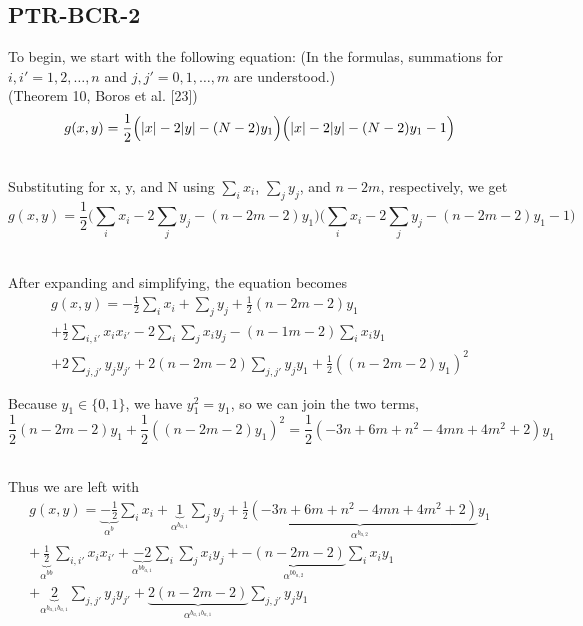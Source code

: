\documentclass[a4paper,11pt]{article}
\begin{document}
\subsection{PTR-BCR-2}

To begin, we start with the following equation: (In the formulas, summations for $i,i' = 1,2,\dots,n$ and $j,j' = 0,1,\dots,m$ are understood.)\\(Theorem 10, Boros et al. [23])
\begin{equation}
  g(x,y) = \frac{1}{2}\Big(\abs{x} - 2\abs{y} - (N - 2)y_1\Big)\Big(\abs{x} - 2\abs{y} - (N - 2)y_1 - 1\Big)
\end{equation}

\noindent \\Substituting for x, y, and N using $\sum_i x_i$, $\sum_j y_j$, and $n - 2m$, respectively, we get
\begin{equation}
  g(x,y) = \frac{1}{2}\Big(\sum_i x_i - 2\sum_j y_j - (n - 2m - 2)y_1\Big)\Big(\sum_i x_i - 2\sum_j y_j - (n - 2m - 2)y_1 - 1\Big)
\end{equation}

\noindent \\After expanding and simplifying, the equation becomes
\begin{equation}
\begin{split}
  \left.
  g(x,y)
  \right.
  = -\frac{1}{2}\sum_i x_i + \sum_j y_j + \frac{1}{2}(n-2m-2)y_1\\
  + \frac{1}{2}\sum_{i,i'}x_i x_{i'} -2\sum_i \sum_j x_i y_j -(n-1m-2)\sum_i x_i y_{1}\\
  + 2\sum_{j,j'} y_j y_{j'} + 2(n-2m-2)\sum_{j,j'} y_j y_{1} + \frac{1}{2}((n-2m-2)y_1)^2
\end{split}
\end{equation}

\noindent Because $y_{1}\in\{0,1\}$, we have $y_{1}^2=y_{1}$, so we can join the two terms,
\begin{equation}
  \frac{1}{2}(n-2m-2)y_1 + \frac{1}{2}((n-2m-2)y_1)^2 = \frac{1}{2}(-3n + 6m + n^2 - 4mn + 4m^2 + 2)y_1
\end{equation}

\noindent \\Thus we are left with
\begin{equation}
\begin{split}
  \left.
  g(x,y)
  \right.
  = \underbrace{-\frac{1}{2}}_{\alpha^b}\sum_i x_i
  + \underbrace{1}_{\alpha^{b_{a,1}}}\sum_j y_j
  + \underbrace{\frac{1}{2}(-3n + 6m + n^2 - 4mn + 4m^2 + 2)}_{\alpha^{b_{a,2}}}y_1\\
  + \underbrace{\frac{1}{2}}_{\alpha^{bb}}\sum_{i,i'}x_i x_{i'}
  + \underbrace{-2}_{\alpha^{bb_{a,1}}}\sum_i \sum_j x_i y_j
  + \underbrace{-(n-2m-2)}_{\alpha^{bb_{a,2}}}\sum_i x_i y_{1}\\
  + \underbrace{2}_{\alpha^{b_{a,1}b_{a,1}}}\sum_{j,j'} y_j y_{j'}
  + \underbrace{2(n-2m-2)}_{\alpha^{b_{a,1}b_{a,1}}}\sum_{j,j'} y_j y_{1}
\end{split}
\end{equation}
\end{document}
